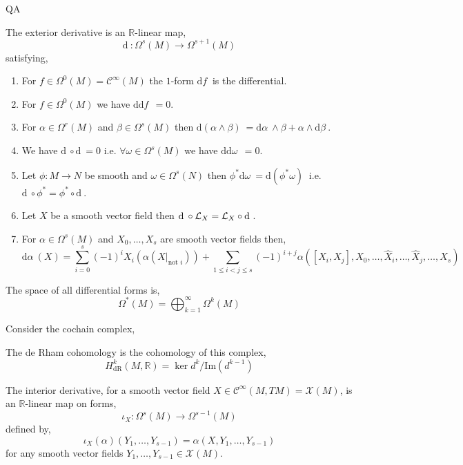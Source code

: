 QA	 \documentclass[12pt]{extarticle}
\newcommand{\R}{\mathbb{R}}
\renewcommand{\Im}[1]{\mathrm{Im}(#1)}
\renewcommand{\d}[1]{ \mathrm{d}#1 \:}
\theoremstyle{definition}
\newenvironment{definition}[1][Definition:]{\begin{trivlist}
\item[\hskip \labelsep {\bfseries #1}]}{\end{trivlist}}
\newcommand{\C}[1]{\mathcal{C}^{#1}}
\begin{document}
\begin{definition}
The exterior derivative is an $\R$-linear map,
\[ \d{} : \Omega^s(M) \to \Omega^{s+1}(M) \]
satisfying,
\begin{enumerate}
\item For $f \in \Omega^0(M) = \C{\infty}(M)$ the $1$-form $\d{f}$ is the differential.
\item For $f \in \Omega^0(M)$ we have $\d{\d{f}} = 0 $.
\item For $\alpha \in \Omega^r(M)$ and $\beta \in \Omega^s(M)$ then $\d{(\alpha \wedge \beta)} = \d{\alpha} \wedge \beta + \alpha \wedge \d{\beta}$. 
\item We have $\d{} \circ \d{} = 0$ i.e. $\forall \omega \in \Omega^{s}(M)$ we have $\d{\d{\omega}} = 0$.
\item Let $\phi : M \to N$ be smooth and $\omega \in \Omega^s(N)$ then $\phi^* \d{\omega} = \d{(\phi^* \omega)}$ i.e. $\d{} \circ \phi^* = \phi^* \circ \d{}$.
\item Let $X$ be a smooth vector field then $\d{} \circ \L_X = \L_X \circ \d{}$.
\item For $\alpha \in \Omega^s(M)$ and $X_0, \dots, X_s$ are smooth vector fields then,
\[ \d{\alpha}(X) = \sum_{i = 0}^s (-1)^i X_i \left( \alpha(X|_{\text{not } i}) \right) + \sum_{1 \le i < j \le s} (-1)^{i + j} \alpha([X_i, X_j], X_0, \dots, \hat{X}_i, \dots, \hat{X}_j, \dots, X_s) \] 
\end{enumerate}
\end{definition}

\begin{definition}
The space of all differential forms is,
\[ \Omega^{\ast}(M) = \bigoplus_{k = 1}^\infty \Omega^k(M) \]
\end{definition}

\begin{definition}
Consider the cochain complex,
\begin{center}
\end{center}
The de Rham cohomology is the cohomology of this complex,
\[ H_{\text{dR}}^k(M, \R) = \ker{d^k}/\Im{d^{k-1}} \]
\end{definition}

\begin{definition}
The interior derivative, for a smooth vector field $X \in \C{\infty}(M, TM) = \mathscr{X}(M)$, is an $\R$-linear map on forms,
\[ \iota_X : \Omega^s(M) \to \Omega^{s-1}(M) \]
defined by,
\[ \iota_X(\alpha)(Y_1, \dots, Y_{s-1}) = \alpha(X, Y_1, \dots, Y_{s-1}) \]
for any smooth vector fields $Y_1, \dots, Y_{s-1} \in \mathscr{X}(M)$. 
\end{definition}
\end{document}
